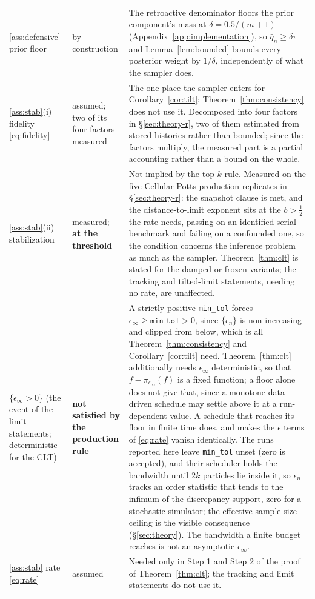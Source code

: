 \documentclass[10pt]{article}
\theoremstyle{plain}
\theoremstyle{definition}
\begin{document}
\begin{table}[h]
\begin{tabular}{@{}p{}p{}p{}@{}}
\ref{ass:defensive} prior floor & by construction & The retroactive denominator floors the prior component's mass at $\delta=0.5/(m{+}1)$ (Appendix~\ref{app:implementation}), so $\bar q_n\ge\delta\pi$ and Lemma~\ref{lem:bounded} bounds every posterior weight by $1/\delta$, independently of what the sampler does. \\
\ref{ass:stab}(i) fidelity \eqref{eq:fidelity} & assumed; two of its four factors measured & The one place the sampler enters for Corollary~\ref{cor:tilt}; Theorem~\ref{thm:consistency} does not use it. Decomposed into four factors in \S\ref{sec:theory-r}, two of them estimated from stored histories rather than bounded; since the factors multiply, the measured part is a partial accounting rather than a bound on the whole. \\
\ref{ass:stab}(ii) stabilization & measured; \textbf{at the threshold} & Not implied by the top-$k$ rule. Measured on the five Cellular Potts production replicates in \S\ref{sec:theory-r}: the snapshot clause is met, and the distance-to-limit exponent sits at the $b>\tfrac12$ the rate needs, passing on an identified serial benchmark and failing on a confounded one, so the condition concerns the inference problem as much as the sampler. Theorem~\ref{thm:clt} is stated for the damped or frozen variants; the tracking and tilted-limit statements, needing no rate, are unaffected. \\
$\{\epsilon_\infty>0\}$ (the event of the limit statements; deterministic for the CLT) & \textbf{not satisfied by the production rule} & A strictly positive \texttt{min\_tol} forces $\epsilon_\infty\ge\texttt{min\_tol}>0$, since $\{\epsilon_n\}$ is non-increasing and clipped from below, which is all Theorem~\ref{thm:consistency} and Corollary~\ref{cor:tilt} need. Theorem~\ref{thm:clt} additionally needs $\epsilon_\infty$ deterministic, so that $f-\pi_{\epsilon_\infty}(f)$ is a fixed function; a floor alone does not give that, since a monotone data-driven schedule may settle above it at a run-dependent value. A schedule that reaches its floor in finite time does, and makes the $\epsilon$ terms of \eqref{eq:rate} vanish identically. The runs reported here leave \texttt{min\_tol} unset (zero is accepted), and their scheduler holds the bandwidth until $2k$ particles lie inside it, so $\epsilon_n$ tracks an order statistic that tends to the infimum of the discrepancy support, zero for a stochastic simulator; the effective-sample-size ceiling is the visible consequence (\S\ref{sec:theory}). The bandwidth a finite budget reaches is not an asymptotic $\epsilon_\infty$. \\
\ref{ass:stab} rate \eqref{eq:rate} & assumed & Needed only in Step 1 and Step 2 of the proof of Theorem~\ref{thm:clt}; the tracking and limit statements do not use it. \\
\bottomrule
\end{tabular}
\end{table}
\end{document}
